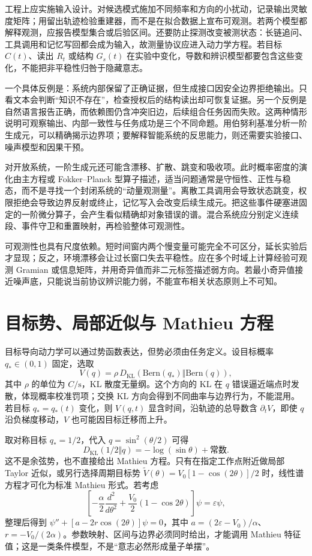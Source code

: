 工程上应实施输入设计。对候选模式施加不同频率和方向的小扰动，记录输出灵敏度矩阵；用留出轨迹检验重建器，而不是在拟合数据上宣布可观测。若两个模型都解释观测，应报告模型集合或后验区间。还要防止探测改变被测状态：长链追问、工具调用和记忆写回都会成为输入，故测量协议应进入动力学方程。若目标 $C(t)$、读出 $R_t$ 或结构 $G_s(t)$ 在实验中变化，导数和辨识模型都要包含这些变化，不能把非平稳性归咎于隐藏意志。

一个具体反例是：系统内部保留了正确证据，但生成接口因安全边界拒绝输出。只看文本会判断“知识不存在”，检查授权后的结构读出却可恢复证据。另一个反例是自然语言报告正确，而依赖图仍含冲突旧边，后续组合任务因而失败。这两种情形说明可观察输出、内部一致性与任务成功是三个不同命题。用伯努利基准分析一阶生成元，可以精确揭示边界项；要解释智能系统的反思能力，则还需要实验接口、噪声模型和因果干预。

对开放系统，一阶生成元还可能含漂移、扩散、跳变和吸收项。此时概率密度的演化由主方程或 Fokker--Planck 型算子描述，适当问题通常是守恒性、正性与稳态，而不是寻找一个封闭系统的“动量观测量”。离散工具调用会导致状态跳变，权限拒绝会导致边界反射或终止，记忆写入会改变后续生成元。把这些事件硬塞进固定的一阶微分算子，会产生看似精确却对象错误的谱。混合系统应分别定义连续段、事件守卫和重置映射，再检验整体可观测性。

可观测性也具有尺度依赖。短时间窗内两个慢变量可能完全不可区分，延长实验后才显现；反之，环境漂移会让过长窗口失去平稳性。应在多个时域上计算经验可观测 Gramian 或信息矩阵，并用奇异值而非二元标签描述弱方向。若最小奇异值接近噪声底，只能说当前协议辨识能力弱，不能宣布相关状态原则上不可知。

\section{目标势、局部近似与 Mathieu 方程}
\label{sec:teleological_potential_quantum_pendulum}

目标导向动力学可以通过势函数表达，但势必须由任务定义。设目标概率 $q_*\in(0,1)$ 固定，选取
\[
V(q)=\rho\,D_{\mathrm{KL}}(\mathrm{Bern}(q_*)\Vert\mathrm{Bern}(q)),
\]
其中 $\rho$ 的单位为 $C/\mathrm{s}$，KL 散度无量纲。这个方向的 KL 在 $q$ 错误逼近端点时发散，体现概率校准罚项；交换 KL 方向会得到不同曲率与边界行为，不能混用。若目标 $q_*=q_*(t)$ 变化，则 $V(q,t)$ 显含时间，沿轨迹的总导数含 $\partial_tV$，即使 $q$ 沿负梯度移动，$V$ 也可能因目标迁移而上升。

取对称目标 $q_*=1/2$，代入 $q=\sin^2(\theta/2)$ 可得
\[
D_{\mathrm{KL}}(1/2\Vert q)=-\log(\sin\theta)+\text{常数}.
\]
这不是余弦势，也不直接给出 Mathieu 方程。只有在指定工作点附近做局部 Taylor 近似，或另行选择周期目标势 $\widetilde V(\theta)=V_0[1-\cos(2\theta)]/2$ 时，线性谱方程才可化为标准 Mathieu 形式。若考虑
\[
\left[-\frac{\alpha}{2}\frac{d^2}{d\theta^2}+\frac{V_0}{2}(1-\cos2\theta)\right]\psi=\varepsilon\psi ,
\]
整理后得到 $\psi''+[a-2r\cos(2\theta)]\psi=0$，其中 $a=(2\varepsilon-V_0)/\alpha$、$r=-V_0/(2\alpha)$。参数映射、区间与边界必须同时给出，才能调用 Mathieu 特征值；这是一类条件模型，不是“意志必然形成量子单摆”。

